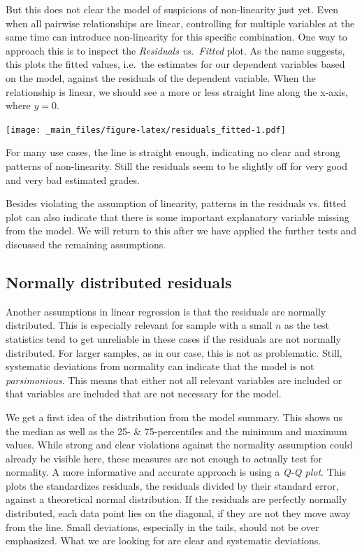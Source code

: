 \documentclass[
]{book}
\begin{document}
But this does not clear the model of suspicions of non-linearity just yet. Even
when all pairwise relationships are linear, controlling for multiple variables
at the same time can introduce non-linearity for this specific combination.
One way to approach this is to inspect the \emph{Residuals vs.~Fitted} plot. As the
name suggests, this plots the fitted values, i.e.~the estimates for our
dependent variables based on the model, against the residuals of the dependent
variable. When the relationship is linear, we should see a more or less straight
line along the x-axis, where \(y = 0\).

\texttt{[image: \_main\_files/figure-latex/residuals\_fitted-1.pdf]}

For many use cases, the line is straight enough, indicating no clear and strong
patterns of non-linearity. Still the residuals seem to be slightly off for very
good and very bad estimated grades.

Besides violating the assumption of linearity, patterns in the residuals vs.
fitted plot can also indicate that there is some important explanatory variable
missing from the model.
We will return to this after we have applied the further tests and
discussed the remaining assumptions.

\hypertarget{normally-distributed-residuals}{%
\subsection{Normally distributed residuals}\label{normally-distributed-residuals}}

Another assumptions in linear regression is that the residuals are normally
distributed. This is especially relevant for sample with a small \(n\) as the
test statistics tend to get unreliable in these cases if the residuals are not
normally distributed. For larger samples, as in our case, this is not as
problematic. Still, systematic deviations from normality can indicate that the
model is not \emph{parsimonious}. This means that either not all relevant variables
are included or that variables are included that are not necessary for the model.

We get a first idea of the distribution from the model summary. This shows us
the median as well as the 25- \& 75-percentiles and the minimum and maximum values.
While strong and clear violations against the normality assumption could already
be visible here, these measures are not enough to actually test for normality.
A more informative and accurate approach is using a \emph{Q-Q plot}. This plots the
standardizes residuals, the residuals divided by their standard error, against
a theoretical normal distribution. If the residuals are perfectly normally
distributed, each data point lies on the diagonal, if they are not they move
away from the line. Small deviations, especially in the tails, should not be
over emphasized. What we are looking for are clear and systematic deviations.
\end{document}
